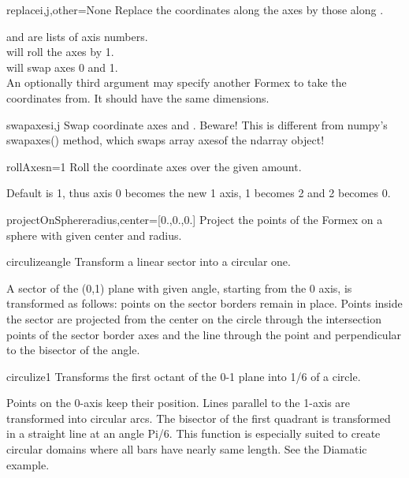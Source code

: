\begin{methoddesc}{replace}{i,j,other=None}
Replace the coordinates along the axes  by those along .

 and  are lists of axis numbers.\\
 will roll the axes by 1.\\
 will swap axes 0 and 1.\\
An optionally third argument may specify another Formex to take the coordinates from. It should have the same dimensions.
\end{methoddesc}

\begin{methoddesc}{swapaxes}{i,j}
Swap coordinate axes  and .
Beware! This is different from numpy's swapaxes() method, which swaps array axesof the ndarray object!
\end{methoddesc}

\begin{methoddesc}{rollAxes}{n=1}
Roll the coordinate axes over the given amount.

Default is 1, thus axis 0 becomes the new 1 axis, 1 becomes 2 and 2 becomes 0.
\end{methoddesc}

\begin{methoddesc}{projectOnSphere}{radius,center=[0.,0.,0.]}
Project the points of the Formex on a sphere with given center and radius.
\end{methoddesc}


\begin{methoddesc}{circulize}{angle}
Transform a linear sector into a circular one.

A sector of the (0,1) plane with given angle, starting from the 0 axis,
is transformed as follows: points on the sector borders remain in
place. Points inside the sector are projected from the center on the
circle through the intersection points of the sector border axes and
the line through the point and perpendicular to the bisector of the
angle.
\end{methoddesc}

\begin{methoddesc}{circulize1}{}
Transforms the first octant of the 0-1 plane into 1/6 of a circle.

Points on the 0-axis keep their position. Lines parallel to the 1-axis
are transformed into circular arcs. The bisector of the first quadrant
is transformed in a straight line at an angle Pi/6.
This function is especially suited to create circular domains where
all bars have nearly same length. See the Diamatic example.
\end{methoddesc}

